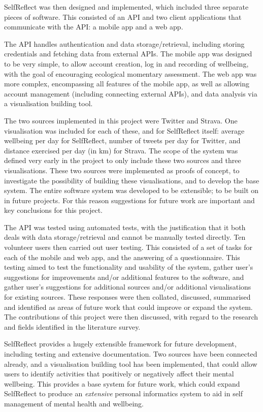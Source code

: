\documentclass[11pt,openright,a4paper]{report}
\begin{document}
SelfReflect was then designed and implemented, which included three separate pieces of software. This consisted of an API and two client applications that communicate with the API: a mobile app and a web app.

The API handles authentication and data storage/retrieval, including storing credentials and fetching data from external APIs. The mobile app was  designed to be very simple, to allow account creation, log in and recording of wellbeing, with the goal of encouraging ecological momentary assessment. The web app was more complex, encompassing all features of the mobile app, as well as allowing account management (including connecting external APIs), and data analysis via a visualisation building tool.

The two sources implemented in this project were Twitter and Strava. One visualisation was included for each of these, and for SelfReflect itself: average wellbeing per day for SelfReflect, number of tweets per day for Twitter, and distance exercised per day (in km) for Strava. The scope of the system was defined very early in the project to only include these two sources and three visualisations. These two sources were implemented as proofs of concept, to investigate the possibility of building these visualisations, and to develop the base system. The entire software system was developed to be extensible; to be built on in future projects. For this reason suggestions for future work are important and key conclusions for this project.

The API was tested using automated tests, with the justification that it both deals with data storage/retrieval and cannot be manually tested directly. Ten volunteer users then carried out user testing. This consisted of a set of tasks for each of the mobile and web app, and the answering of a questionnaire. This testing aimed to test the functionality and usability of the system, gather user's suggestions for improvements and/or additional features to the software, and gather user's suggestions for additional sources and/or additional visualisations for existing sources. These responses were then collated, discussed, summarised and identified as areas of future work that could improve or expand the system. The contributions of this project were then discussed, with regard to the research and fields identified in the literature survey.

SelfReflect provides a hugely extensible framework for future development, including testing and extensive documentation. Two sources have been connected already, and a visualisation building tool has been implemented, that could allow users to identify activities that positively or negatively affect their mental wellbeing. This provides a base system for future work, which could expand SelfReflect to produce an \emph{extensive} personal informatics system to aid in self management of mental health and wellbeing.
\end{document}
